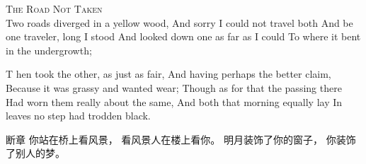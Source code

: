 \begin{vertlst}

\lettrine[lines=3]{T}{he Road Not Taken} \\
Two roads diverged in a yellow wood,
And sorry I could not travel both
And be one traveler, long I stood
And looked down one as far as I could
To where it bent in the undergrowth;

\lettrine[lines=2]{T}{} hen took the other, as just as fair,
And having perhaps the better claim,
Because it was grassy and wanted wear;
Though as for that the passing there
Had worn them really about the same,
And both that morning equally lay
In leaves no step had trodden black.

\lettrine{断}{章}
你站在桥上看风景，
看风景人在楼上看你。
明月装饰了你的窗子，
你装饰了别人的梦。
\end{vertlst}